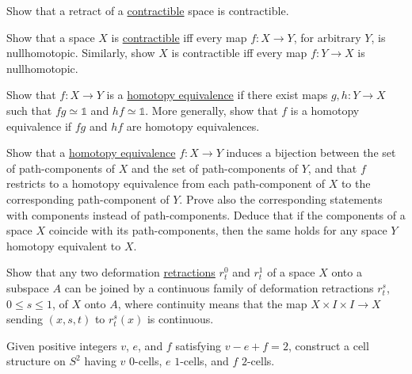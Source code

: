 	\begin{exercise}[Hatcher 0.9]
		Show that a retract of a \hyperref[def:contractible]{contractible} space is contractible.
	\end{exercise}

	\begin{exercise}[Hatcher 0.10]
		Show that a space $X$ is \hyperref[def:contractible]{contractible} iff every map $f: X \to Y$, for arbitrary $Y$, is nullhomotopic. Similarly, show $X$ is contractible iff every map $f: Y \to X$ is nullhomotopic.
	\end{exercise}

	\begin{exercise}[Hatcher 0.11]
		Show that $f: X \to Y$ is a \hyperref[def:homotopy-equivalence]{homotopy equivalence} if there exist maps $g, h: Y \to X$ such that $fg \simeq \mathbb{1}$ and $hf \simeq \mathbb{1}$. More generally, show that $f$ is a homotopy equivalence if $fg$ and $hf$ are homotopy equivalences.
	\end{exercise}

	\begin{exercise}[Hatcher 0.12]
		Show that a \hyperref[def:homotopy-equivalence]{homotopy equivalence} $f: X \to Y$ induces a bijection between the set of path-components of $X$ and the set of path-components of $Y$, and that $f$ restricts to a homotopy equivalence from each path-component of $X$ to the corresponding path-component of $Y$. Prove also the corresponding statements with components instead of path-components. Deduce that if the components of a space $X$ coincide with its path-components, then the same holds for any space $Y$ homotopy equivalent to $X$.
	\end{exercise}

	\begin{exercise}[Hatcher 0.13]
		Show that any two deformation \hyperref[def:retraction]{retractions} $r_t^0$ and $r_t^1$ of a space $X$ onto a subspace $A$ can be joined by a continuous family of deformation retractions $r_t^s$, $0 \leq s \leq 1$, of $X$ onto $A$, where continuity means that the map $X \times I \times I \to X$ sending $(x,s,t)$ to $r_t^s(x)$ is continuous.
	\end{exercise}

	\begin{exercise}[Hatcher 0.14]
		Given positive integers $v$, $e$, and $f$ satisfying $v - e + f = 2$, construct a cell structure on $S^2$ having $v$ $0$-cells, $e$ $1$-cells, and $f$ $2$-cells.
	\end{exercise}

